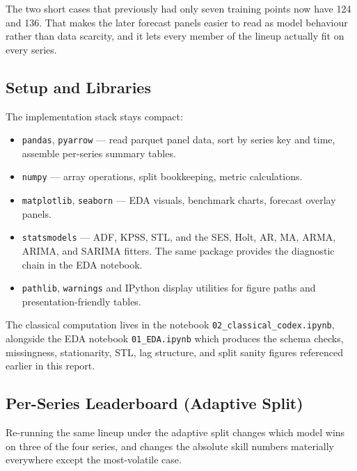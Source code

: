 The two short cases that previously had only seven training points now have 124 and 136. That makes the later forecast panels easier to read as model behaviour rather than data scarcity, and it lets every member of the lineup actually fit on every series.

\subsection{Setup and Libraries}
\label{sec:classical:libraries}

The implementation stack stays compact:

\begin{itemize}
  \item \texttt{pandas}, \texttt{pyarrow} --- read parquet panel data, sort by series key and time, assemble per-series summary tables.
  \item \texttt{numpy} --- array operations, split bookkeeping, metric calculations.
  \item \texttt{matplotlib}, \texttt{seaborn} --- EDA visuals, benchmark charts, forecast overlay panels.
  \item \texttt{statsmodels} --- ADF, KPSS, STL, and the SES, Holt, AR, MA, ARMA, ARIMA, and SARIMA fitters. The same package provides the diagnostic chain in the EDA notebook.
  \item \texttt{pathlib}, \texttt{warnings} and IPython display utilities for figure paths and presentation-friendly tables.
\end{itemize}

The classical computation lives in the notebook \texttt{02\_classical\_codex.ipynb}, alongside the EDA notebook \texttt{01\_EDA.ipynb} which produces the schema checks, missingness, stationarity, STL, lag structure, and split sanity figures referenced earlier in this report.

\subsection{Per-Series Leaderboard (Adaptive Split)}
\label{sec:classical:leaderboard_adaptive}

Re-running the same lineup under the adaptive split changes which model wins on three of the four series, and changes the absolute skill numbers materially everywhere except the most-volatile case.

